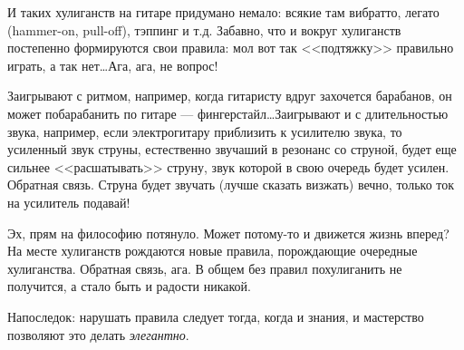 И таких хулиганств на гитаре придумано немало: всякие там вибратто, легато (hammer-on, pull-off), тэппинг и т.д. Забавно, что и вокруг хулиганств постепенно формируются свои правила: мол вот так <<подтяжку>> правильно играть, а так нет\ldots Ага, ага, не вопрос!

Заигрывают с ритмом, например, когда гитаристу вдруг захочется барабанов, он может побарабанить по гитаре --- фингерстайл\ldots Заигрывают и с длительностью звука, например, если электрогитару приблизить к усилителю звука, то усиленный звук струны, естественно звучаший в резонанс со струной, будет еще сильнее <<расшатывать>> струну, звук которой в свою очередь будет усилен. Обратная связь. Струна будет звучать (лучше сказать визжать) вечно, только ток на усилитель подавай!

Эх, прям на философию потянуло. Может потому-то и движется жизнь вперед? На месте хулиганств рождаются новые правила, порождающие очередные хулиганства. Обратная связь, ага. В общем без правил похулиганить не получится, а стало быть и радости никакой.

Напоследок: нарушать правила следует тогда, когда и знания, и мастерство позволяют это делать \emph{элегантно}.